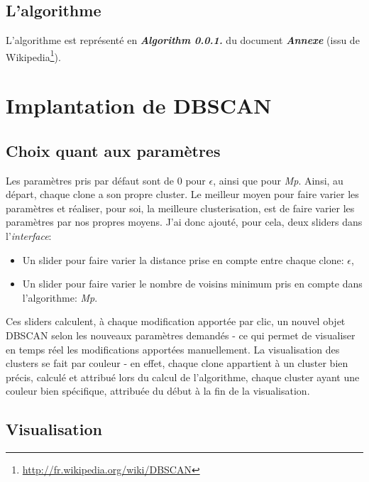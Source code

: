 \documentclass[12pt]{report}
\begin{document}
\begin{spacing}{1.2}
\subsection{L'algorithme}

L'algorithme est représenté en \textbf{\textit{Algorithm 0.0.1.}} du document \textbf{\textit{Annexe}} (issu de Wikipedia\footnote{\url{http://fr.wikipedia.org/wiki/DBSCAN}}).

\section{Implantation de DBSCAN}

\subsection{Choix quant aux paramètres}

Les paramètres pris par défaut sont de 0 pour $\epsilon$, ainsi que pour \textit{Mp}. Ainsi, au départ, chaque clone a son propre cluster.
\newline
Le meilleur moyen pour faire varier les paramètres et réaliser, pour soi, la meilleure clusterisation, est de faire varier les paramètres par nos propres moyens.
\newline
J'ai donc ajouté, pour cela, deux sliders dans l'\textit{interface}:
	\begin{itemize}
	\item{Un slider pour faire varier la distance prise en compte entre chaque clone: $\epsilon$},
	\item{Un slider pour faire varier le nombre de voisins minimum pris en compte dans l'algorithme: \textit{Mp}.}
	\end{itemize}
Ces sliders calculent, à chaque modification apportée par clic, un nouvel objet DBSCAN selon les nouveaux paramètres demandés - ce qui permet de visualiser en temps réel les modifications apportées manuellement.
\newline
La visualisation des clusters se fait par couleur - en effet, chaque clone appartient à un cluster bien précis, calculé et attribué lors du calcul de l'algorithme, chaque cluster ayant une couleur bien spécifique, attribuée du début à la fin de la visualisation.

\subsection{Visualisation}


\end{spacing}
\end{document}
